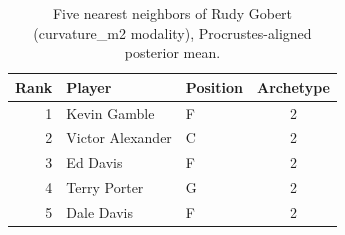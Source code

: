 \begin{table}[htbp]
  \centering\small
  \begin{tabular}{rllc}
    \toprule
    Rank & Player & Position & Archetype \\
    \midrule
    1 & Kevin Gamble & F & 2 \\
    2 & Victor Alexander & C & 2 \\
    3 & Ed Davis & F & 2 \\
    4 & Terry Porter & G & 2 \\
    5 & Dale Davis & F & 2 \\
    \bottomrule
  \end{tabular}
  \caption{Five nearest neighbors of Rudy Gobert (curvature_m2 modality), Procrustes-aligned posterior mean.}
  \label{tab:Rudy_Gobert_neighbors_curvature_m2}
\end{table}

